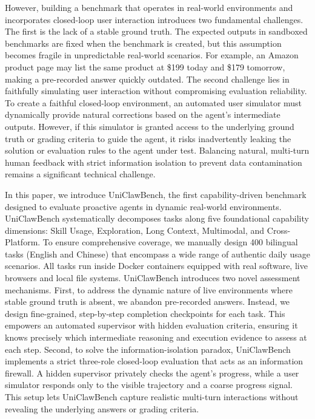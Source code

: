 However, building a benchmark that operates in real-world environments and incorporates closed-loop user interaction introduces two fundamental challenges. The first is the lack of a stable ground truth. The expected outputs in sandboxed benchmarks are fixed when the benchmark is created, but this assumption becomes fragile in unpredictable real-world scenarios. For example, an Amazon product page may list the same product at \$199 today and \$179 tomorrow, making a pre-recorded answer quickly outdated. The second challenge lies in faithfully simulating user interaction without compromising evaluation reliability. To create a faithful closed-loop environment, an automated user simulator must dynamically provide natural corrections based on the agent's intermediate outputs. However, if this simulator is granted access to the underlying ground truth or grading criteria to guide the agent, it risks inadvertently leaking the solution or evaluation rules to the agent under test. Balancing natural, multi-turn human feedback with strict information isolation to prevent data contamination remains a significant technical challenge. 

In this paper, we introduce UniClawBench, the first capability-driven benchmark designed to evaluate proactive agents in dynamic real-world environments. UniClawBench systematically decomposes tasks along five foundational capability dimensions: Skill Usage, Exploration, Long Context, Multimodal, and Cross-Platform. To ensure comprehensive coverage, we manually design 400 bilingual tasks (English and Chinese) that encompass a wide range of authentic daily usage scenarios. All tasks run inside Docker containers equipped with real software, live browsers and local file systems. UniClawBench introduces two novel assessment mechanisms. First, to address the dynamic nature of live environments where stable ground truth is absent, we abandon pre-recorded answers. Instead, we design fine-grained, step-by-step completion checkpoints for each task. This empowers an automated supervisor with hidden evaluation criteria, ensuring it knows precisely which intermediate reasoning and execution evidence to assess at each step. Second, to solve the information-isolation paradox, UniClawBench implements a strict three-role closed-loop evaluation that acts as an information firewall. A hidden supervisor privately checks the agent's progress, while a user simulator responds only to the visible trajectory and a coarse progress signal. This setup lets UniClawBench capture realistic multi-turn interactions without revealing the underlying answers or grading criteria.







